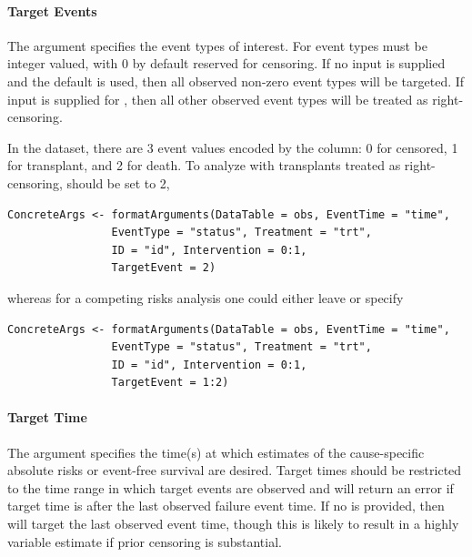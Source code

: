 \documentclass{report}
\newcommand{\1}{\ensuremath{\mathbf{1}}}
\begin{document}
\paragraph{Target Events}
\label{TargetEvent}
The  argument specifies the event types of interest. For  event types must be integer valued, with 0 by default reserved for censoring. If no input is supplied and the default  is used, then all observed non-zero event types will be targeted. If input is supplied for , then all other observed event types will be treated as right-censoring.

In the  dataset, there are 3 event values encoded by the  column: 0 for censored, 1 for transplant, and 2 for death. To analyze  with transplants treated as right-censoring,  should be set to 2,
\begin{lstlisting}
ConcreteArgs <- formatArguments(DataTable = obs, EventTime = "time",
				EventType = "status", Treatment = "trt",
				ID = "id", Intervention = 0:1,
				TargetEvent = 2)
\end{lstlisting}
whereas for a competing risks analysis one could either leave  or specify 
\begin{lstlisting}
ConcreteArgs <- formatArguments(DataTable = obs, EventTime = "time",
				EventType = "status", Treatment = "trt",
				ID = "id", Intervention = 0:1,
				TargetEvent = 1:2)
\end{lstlisting}

\paragraph{Target Time}
\label{TargetTime}
The  argument specifies the time(s) at which estimates of the cause-specific absolute risks or event-free survival are desired. Target times should be restricted to the time range in which target events are observed and  will return an error if target time is after the last observed failure event time. If no  is provided, then  will target the last observed event time, though this is likely to result in a highly variable estimate if prior censoring is substantial. 
\end{document}
